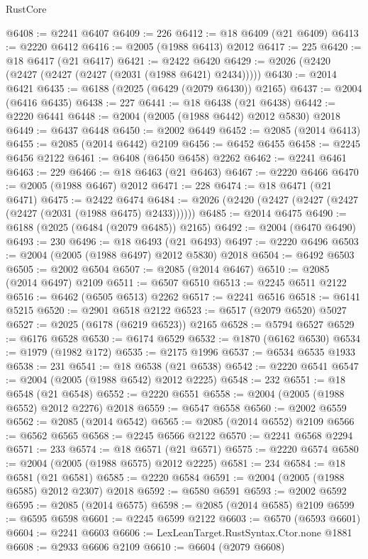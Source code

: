 \begin{lexlean}{RustCore}
\begin{coremodule}
@6408 := @2241 @6407
@6409 := 226
@6412 := @18 @6409 (@21 @6409)
@6413 := @2220 @6412
@6416 := @2005 (@1988 @6413) @2012
@6417 := 225
@6420 := @18 @6417 (@21 @6417)
@6421 := @2422 @6420
@6429 := @2026 (@2420 (@2427 (@2427 (@2427 (@2031 (@1988 @6421) @2434)))))
@6430 := @2014 @6421
@6435 := @6188 (@2025 (@6429 (@2079 @6430)) @2165)
@6437 := @2004 (@6416 @6435)
@6438 := 227
@6441 := @18 @6438 (@21 @6438)
@6442 := @2220 @6441
@6448 := @2004 (@2005 (@1988 @6442) @2012 @5830) @2018
@6449 := @6437 @6448
@6450 := @2002 @6449
@6452 := @2085 (@2014 @6413)
@6455 := @2085 (@2014 @6442) @2109
@6456 := @6452 @6455
@6458 := @2245 @6456 @2122
@6461 := @6408 (@6450 @6458) @2262
@6462 := @2241 @6461
@6463 := 229
@6466 := @18 @6463 (@21 @6463)
@6467 := @2220 @6466
@6470 := @2005 (@1988 @6467) @2012
@6471 := 228
@6474 := @18 @6471 (@21 @6471)
@6475 := @2422 @6474
@6484 := @2026 (@2420 (@2427 (@2427 (@2427 (@2427 (@2031 (@1988 @6475) @2433))))))
@6485 := @2014 @6475
@6490 := @6188 (@2025 (@6484 (@2079 @6485)) @2165)
@6492 := @2004 (@6470 @6490)
@6493 := 230
@6496 := @18 @6493 (@21 @6493)
@6497 := @2220 @6496
@6503 := @2004 (@2005 (@1988 @6497) @2012 @5830) @2018
@6504 := @6492 @6503
@6505 := @2002 @6504
@6507 := @2085 (@2014 @6467)
@6510 := @2085 (@2014 @6497) @2109
@6511 := @6507 @6510
@6513 := @2245 @6511 @2122
@6516 := @6462 (@6505 @6513) @2262
@6517 := @2241 @6516
@6518 := @6141 @5215
@6520 := @2901 @6518 @2122
@6523 := @6517 (@2079 @6520) @5027
@6527 := @2025 (@6178 (@6219 @6523)) @2165
@6528 := @5794 @6527
@6529 := @6176 @6528
@6530 := @6174 @6529
@6532 := @1870 (@6162 @6530)
@6534 := @1979 (@1982 @172)
@6535 := @2175 @1996
@6537 := @6534 @6535 @1933
@6538 := 231
@6541 := @18 @6538 (@21 @6538)
@6542 := @2220 @6541
@6547 := @2004 (@2005 (@1988 @6542) @2012 @2225)
@6548 := 232
@6551 := @18 @6548 (@21 @6548)
@6552 := @2220 @6551
@6558 := @2004 (@2005 (@1988 @6552) @2012 @2276) @2018
@6559 := @6547 @6558
@6560 := @2002 @6559
@6562 := @2085 (@2014 @6542)
@6565 := @2085 (@2014 @6552) @2109
@6566 := @6562 @6565
@6568 := @2245 @6566 @2122
@6570 := @2241 @6568 @2294
@6571 := 233
@6574 := @18 @6571 (@21 @6571)
@6575 := @2220 @6574
@6580 := @2004 (@2005 (@1988 @6575) @2012 @2225)
@6581 := 234
@6584 := @18 @6581 (@21 @6581)
@6585 := @2220 @6584
@6591 := @2004 (@2005 (@1988 @6585) @2012 @2307) @2018
@6592 := @6580 @6591
@6593 := @2002 @6592
@6595 := @2085 (@2014 @6575)
@6598 := @2085 (@2014 @6585) @2109
@6599 := @6595 @6598
@6601 := @2245 @6599 @2122
@6603 := @6570 (@6593 @6601)
@6604 := @2241 @6603
@6606 := LexLeanTarget.RustSyntax.Ctor.none @1881
@6608 := @2933 @6606 @2109
@6610 := @6604 (@2079 @6608)

\end{coremodule}
\end{lexlean}
